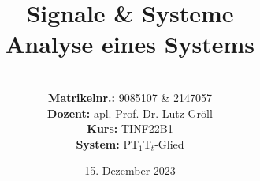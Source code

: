 \documentclass{article}
\title{\textbf{Signale \& Systeme \\ Analyse eines Systems}}
\author{
\vspace{8em} \\
\textbf{Matrikelnr.:} 9085107 \& 2147057 \\
\textbf{Dozent:} apl. Prof. Dr. Lutz Gröll \\
\textbf{Kurs:} TINF22B1 \\
\textbf{System:} PT$_1$T$_t$-Glied
\vspace{8em} 
}
\begin{document}
\date{15. Dezember 2023}

\maketitle


\end{document}
